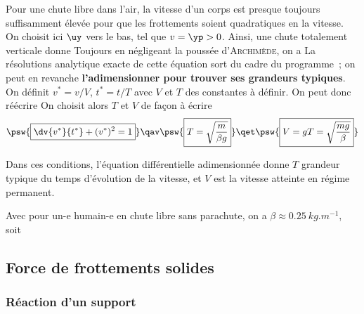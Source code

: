 \documentclass[../../main/main.tex]{subfiles}
\begin{document}
Pour une chute libre dans l'air, la vitesse d'un corps est presque toujours
suffisamment élevée pour que les frottements soient quadratiques en la vitesse.
On choisit ici $\uy$ vers le bas, tel que $v = \yp > 0$. Ainsi, une chute
totalement verticale donne
\psw{%
	\[\Ff_f = -\beta\yp^2\uy\]
}
Toujours en négligeant la poussée d'\textsc{Archimède}, on a
\psw{%
	\[\dv{v}{t} + \frac{\beta}{m}v^2 = g\]
}
La résolutions analytique exacte de cette équation sort du cadre du programme~;
on peut en revanche \textbf{l'adimensionner pour trouver ses grandeurs typiques}.
On définit $v^* = v/V$, $t^* = t/T$ avec $V$ et $T$ des constantes à définir. On
peut donc réécrire
On choisit alors $T$ et $V$ de façon à écrire
\begin{gather*}
	\psw{\boxed{\dv{v^*}{t^*} + (v^*)^2 = 1}}
	\qav
	\psw{\boxed{T = \sqrt{\frac{m}{\beta g}}}}
	\qet
	\psw{\boxed{V = gT = \sqrt{\frac{mg}{\beta}}}}
\end{gather*}

Dans ces conditions, l'équation différentielle adimensionnée donne $T$ grandeur
typique du temps d'évolution de la vitesse, et $V$ est la vitesse atteinte en
régime permanent.

Avec pour un-e humain-e en chute libre sans parachute, on a
$\beta \approx \SI{0.25}{kg.m^{-1}}$, soit
\psw{%
	\[
		\boxed{v_{\lim} = \SI{60}{m.s^{-1} \approx \SI{200}{km.h^{-1}}}}
		\qet
		\boxed{T \approx \SI{6}{s}}
	\]
}


\subsection{Force de frottements solides}
\subsubsection{Réaction d'un support}
\end{document}
